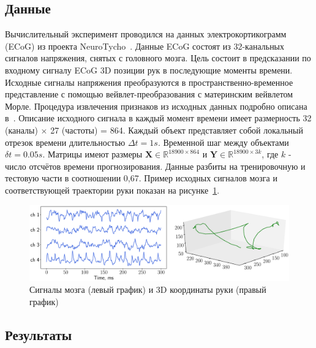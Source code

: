 \documentclass[preprint,12pt]{elsarticle}
\theoremstyle{definition}
\newcommand{\bY}{\mathbf{Y}}
\newcommand{\bX}{\mathbf{X}}
\newcommand{\bbR}{\mathbb{R}}
\begin{document}
\subsection{Данные}

Вычислительный эксперимент проводился на данных электрокортикограмм (ECoG) из проекта NeuroTycho~\cite{shimoda2012decoding}.
Данные ECoG состоят из 32-канальных сигналов напряжения, снятых с головного мозга.
Цель состоит в предсказании по входному сигналу ECoG 3D позиции рук в последующие моменты времени.
Исходные сигналы напряжения преобразуются в пространственно-временное представление с помощью вейвлет-преобразования с материнским вейвлетом Морле.
Процедура извлечения признаков из исходных данных подробно описана в~\cite{chao2010long, eliseyev2016penalized}.
Описание исходного сигнала в каждый момент времени имеет размерность 32 (каналы) $\times $ 27 (частоты) = 864.
Каждый объект представляет собой локальный отрезок времени длительностью $\Delta t = 1s$. Временной шаг между объектами $\delta t = 0.05 s$.
Матрицы имеют размеры $\bX \in \bbR^{18900 \times 864}$ и $\bY \in \bbR^{18900 \times 3k}$, где $k$ - число отсчётов времени прогнозирования.
Данные разбиты на тренировочную и тестовую части в соотношении 0,67. 
Пример исходных сигналов мозга и соответствующей траектории руки показан на рисунке~\ref{fig:ecog_data}.

\begin{figure}
	\centering
	\includegraphics[width=\linewidth]{figs/ecog_data}
	\caption{Сигналы мозга (левый график) и 3D координаты руки (правый график)}
	\label{fig:ecog_data}
\end{figure}

\subsection{Результаты}
\end{document}
